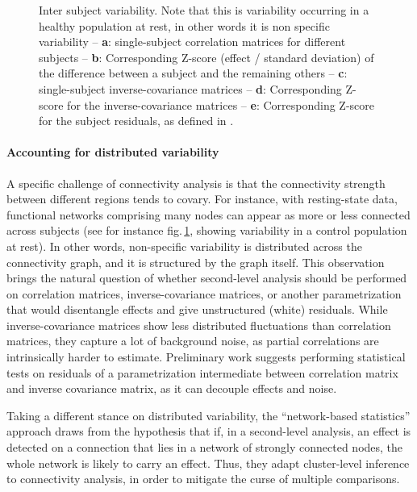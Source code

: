 \documentclass[5p]{elsarticle}
\begin{document}
\begin{figure}
\caption{Inter subject variability. Note that this is variability
occurring in a healthy population at rest, in other words it is non specific
variability -- \textbf{a}: single-subject
correlation matrices for different subjects -- \textbf{b}:
Corresponding Z-score (effect / standard deviation) of the difference
between a subject and the remaining others -- \textbf{c}:
single-subject inverse-covariance matrices -- \textbf{d}: Corresponding Z-score
for the inverse-covariance matrices -- \textbf{e}:
Corresponding Z-score for the subject residuals, as defined in 
\cite{varoquaux2010b}.
\label{fig:inter_subject}}
\end{figure}

\paragraph{Accounting for distributed variability}
%
A specific challenge of connectivity analysis is that the connectivity
strength between different regions tends to covary. For instance, with
resting-state data, functional networks comprising many nodes can appear
as more or less connected across subjects (see for instance
fig.\,\ref{fig:inter_subject}, showing variability in a control
population at rest). In other words, non-specific variability is
distributed across the connectivity graph, and it is structured by the
graph itself. This observation brings the natural question of whether
second-level analysis should be performed on correlation matrices,
inverse-covariance matrices, or another parametrization that would
disentangle effects and give unstructured (white) residuals. While
inverse-covariance matrices show less distributed fluctuations than
correlation matrices, they capture a lot of background noise, as partial
correlations are intrinsically harder to estimate. Preliminary work
\cite{varoquaux2010b} suggests performing statistical tests on residuals of
a parametrization intermediate between correlation matrix and inverse
covariance matrix, as it can decouple effects and noise.

Taking a different stance on distributed variability, the ``network-based
statistics'' approach \cite{zalesky2010} draws from the hypothesis that
if, in a second-level analysis, an effect is detected on a connection
that lies in a network of strongly connected nodes, the whole network is
likely to carry an effect. Thus, they adapt cluster-level inference to
connectivity analysis, in order to mitigate the curse of multiple
comparisons.
\end{document}
